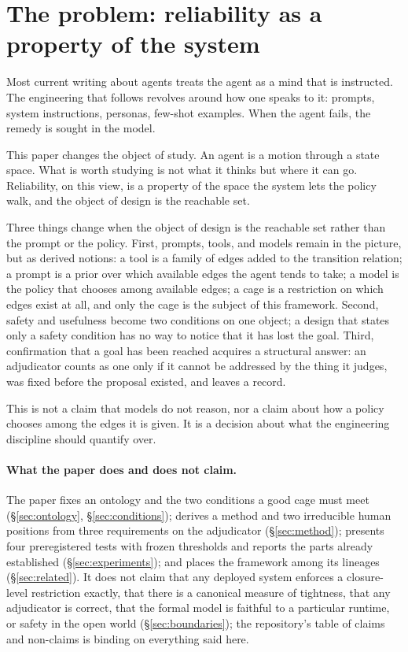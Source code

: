 \section{The problem: reliability as a property of the system}
\label{sec:problem}

Most current writing about agents treats the agent as a mind that is instructed. The engineering that follows revolves around how one speaks to it: prompts, system instructions, personas, few-shot examples. When the agent fails, the remedy is sought in the model.

This paper changes the object of study. An agent is a motion through a state space. What is worth studying is not what it thinks but where it can go. Reliability, on this view, is a property of the space the system lets the policy walk, and the object of design is the reachable set.

Three things change when the object of design is the reachable set rather than the prompt or the policy. First, prompts, tools, and models remain in the picture, but as derived notions: a tool is a family of edges added to the transition relation; a prompt is a prior over which available edges the agent tends to take; a model is the policy that chooses among available edges; a cage is a restriction on which edges exist at all, and only the cage is the subject of this framework. Second, safety and usefulness become two conditions on one object; a design that states only a safety condition has no way to notice that it has lost the goal. Third, confirmation that a goal has been reached acquires a structural answer: an adjudicator counts as one only if it cannot be addressed by the thing it judges, was fixed before the proposal existed, and leaves a record.

This is not a claim that models do not reason, nor a claim about how a policy chooses among the edges it is given. It is a decision about what the engineering discipline should quantify over.

\paragraph{What the paper does and does not claim.}
The paper fixes an ontology and the two conditions a good cage must meet (\S\ref{sec:ontology}, \S\ref{sec:conditions}); derives a method and two irreducible human positions from three requirements on the adjudicator (\S\ref{sec:method}); presents four preregistered tests with frozen thresholds and reports the parts already established (\S\ref{sec:experiments}); and places the framework among its lineages (\S\ref{sec:related}). It does not claim that any deployed system enforces a closure-level restriction exactly, that there is a canonical measure of tightness, that any adjudicator is correct, that the formal model is faithful to a particular runtime, or safety in the open world (\S\ref{sec:boundaries}); the repository's table of claims and non-claims is binding on everything said here.
